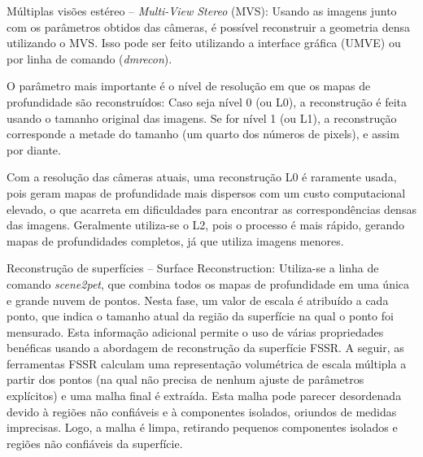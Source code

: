 %

Múltiplas visões estéreo -- {\it Multi-View Stereo} (MVS): Usando as imagens junto com os parâmetros obtidos das câmeras, é possível reconstruir a geometria densa utilizando o MVS. Isso pode ser feito utilizando a interface gráfica (UMVE) ou por linha de comando ({\it dmrecon}).

O parâmetro mais importante é o nível de resolução em que os mapas de profundidade são reconstruídos: Caso seja nível 0 (ou L0), a reconstrução é feita usando o tamanho original das imagens. Se for nível 1 (ou L1), a reconstrução corresponde a metade do tamanho (um quarto dos números de pixels), e assim por diante.

Com a resolução das câmeras atuais, uma reconstrução L0 é raramente usada, pois geram mapas de profundidade mais dispersos com um custo computacional elevado, o que acarreta em dificuldades para encontrar as correspondências densas das imagens. Geralmente utiliza-se o L2, pois o processo é mais rápido, gerando mapas de profundidades completos, já que utiliza imagens menores.


Reconstrução de superfícies -- {Surface Reconstruction}: Utiliza-se a linha de comando {\it scene2pet}, que combina todos os mapas de profundidade em uma única e grande nuvem de pontos. Nesta fase, um valor de escala é atribuído a cada ponto, que indica o tamanho atual da região da superfície na qual o ponto foi mensurado. Esta informação adicional permite o uso de várias propriedades benéficas usando a abordagem de reconstrução da superfície FSSR. %
A seguir, as ferramentas FSSR calculam uma representação volumétrica de escala múltipla a partir dos pontos (na qual não precisa de nenhum ajuste de parâmetros explícitos) e uma malha final é extraída. Esta malha pode parecer desordenada devido à regiões não confiáveis e à componentes isolados, oriundos de medidas imprecisas. Logo, a malha é limpa, retirando pequenos componentes isolados e regiões não confiáveis da superfície. 

